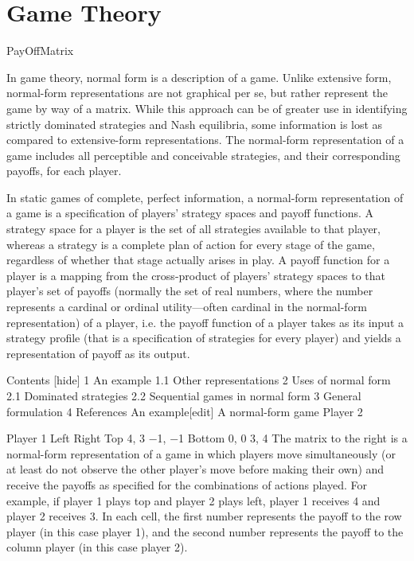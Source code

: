 \documentclass[]{report}
\begin{document}
\chapter{Game Theory}	

PayOffMatrix

In game theory, normal form is a description of a game. Unlike extensive form, normal-form representations are not graphical per se, but rather represent the game by way of a matrix. While this approach can be of greater use in identifying strictly dominated strategies and Nash equilibria, some information is lost as compared to extensive-form representations. The normal-form representation of a game includes all perceptible and conceivable strategies, and their corresponding payoffs, for each player.

In static games of complete, perfect information, a normal-form representation of a game is a specification of players' strategy spaces and payoff functions. A strategy space for a player is the set of all strategies available to that player, whereas a strategy is a complete plan of action for every stage of the game, regardless of whether that stage actually arises in play. A payoff function for a player is a mapping from the cross-product of players' strategy spaces to that player's set of payoffs (normally the set of real numbers, where the number represents a cardinal or ordinal utility—often cardinal in the normal-form representation) of a player, i.e. the payoff function of a player takes as its input a strategy profile (that is a specification of strategies for every player) and yields a representation of payoff as its output.

Contents  [hide] 
1	An example
1.1	Other representations
2	Uses of normal form
2.1	Dominated strategies
2.2	Sequential games in normal form
3	General formulation
4	References
An example[edit]
A normal-form game
Player 2

Player 1
Left	Right
Top	4, 3	−1, −1
Bottom	0, 0	3, 4
The matrix to the right is a normal-form representation of a game in which players move simultaneously (or at least do not observe the other player's move before making their own) and receive the payoffs as specified for the combinations of actions played. For example, if player 1 plays top and player 2 plays left, player 1 receives 4 and player 2 receives 3. In each cell, the first number represents the payoff to the row player (in this case player 1), and the second number represents the payoff to the column player (in this case player 2).
\end{document}
